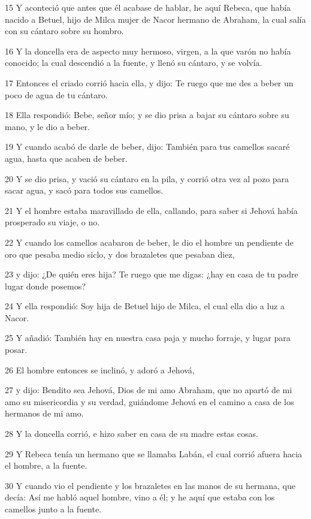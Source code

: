 \par 15 Y aconteció que antes que él acabase de hablar, he aquí Rebeca, que había nacido a Betuel, hijo de Milca mujer de Nacor hermano de Abraham, la cual salía con su cántaro sobre su hombro.
\par 16 Y la doncella era de aspecto muy hermoso, virgen, a la que varón no había conocido; la cual descendió a la fuente, y llenó su cántaro, y se volvía.
\par 17 Entonces el criado corrió hacia ella, y dijo: Te ruego que me des a beber un poco de agua de tu cántaro.
\par 18 Ella respondió: Bebe, señor mío; y se dio prisa a bajar su cántaro sobre su mano, y le dio a beber.
\par 19 Y cuando acabó de darle de beber, dijo: También para tus camellos sacaré agua, hasta que acaben de beber.
\par 20 Y se dio prisa, y vació su cántaro en la pila, y corrió otra vez al pozo para sacar agua, y sacó para todos sus camellos.
\par 21 Y el hombre estaba maravillado de ella, callando, para saber si Jehová había prosperado su viaje, o no.
\par 22 Y cuando los camellos acabaron de beber, le dio el hombre un pendiente de oro que pesaba medio siclo, y dos brazaletes que pesaban diez,
\par 23 y dijo: ¿De quién eres hija? Te ruego que me digas: ¿hay en casa de tu padre lugar donde posemos?
\par 24 Y ella respondió: Soy hija de Betuel hijo de Milca, el cual ella dio a luz a Nacor.
\par 25 Y añadió: También hay en nuestra casa paja y mucho forraje, y lugar para posar.
\par 26 El hombre entonces se inclinó, y adoró a Jehová,
\par 27 y dijo: Bendito sea Jehová, Dios de mi amo Abraham, que no apartó de mi amo su misericordia y su verdad, guiándome Jehová en el camino a casa de los hermanos de mi amo.
\par 28 Y la doncella corrió, e hizo saber en casa de su madre estas cosas.
\par 29 Y Rebeca tenía un hermano que se llamaba Labán, el cual corrió afuera hacia el hombre, a la fuente.
\par 30 Y cuando vio el pendiente y los brazaletes en las manos de su hermana, que decía: Así me habló aquel hombre, vino a él; y he aquí que estaba con los camellos junto a la fuente.

